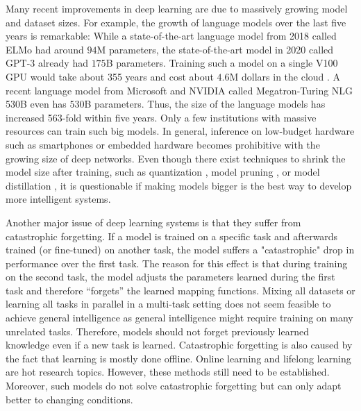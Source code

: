 Many recent improvements in deep learning are due to massively growing model and dataset sizes.
For example, the growth of language models over the last five years is remarkable:
While a state-of-the-art language model from 2018 called ELMo  had around \(94\)M parameters, the state-of-the-art model in 2020 called GPT-3  already had \(175\)B parameters. Training such a model on a single V100 GPU would take about 355 years and cost about \(4.6\)M dollars in the cloud .
A recent language model from Microsoft and NVIDIA called Megatron-Turing NLG 530B  even has \(530\)B parameters.
Thus, the size of the language models has increased 563-fold within five years.
Only a few institutions with massive resources can train such big models.
In general, inference on low-budget hardware such as smartphones or embedded hardware becomes prohibitive with the growing size of deep networks.
Even though there exist techniques to shrink the model size after training, such as quantization , model pruning , or model distillation , it is questionable if making models bigger is the best way to develop more intelligent systems.

Another major issue of deep learning systems is that they suffer from catastrophic forgetting.
If a model is trained on a specific task and afterwards trained (or fine-tuned) on another task, the model suffers a "catastrophic" drop in performance over the first task.
The reason for this effect is that during training on the second task, the model adjusts the parameters learned during the first task and therefore ``forgets'' the learned mapping functions.
Mixing all datasets or learning all tasks in parallel in a multi-task setting  does not seem feasible to achieve general intelligence as general intelligence might require training on many unrelated tasks. Therefore, models should not forget previously learned knowledge even if a new task is learned.
Catastrophic forgetting is also caused by the fact that learning is mostly done offline.
Online learning  and lifelong learning  are hot research topics.
However, these methods still need to be established. Moreover, such models do not solve catastrophic forgetting but can only adapt better to changing conditions.

